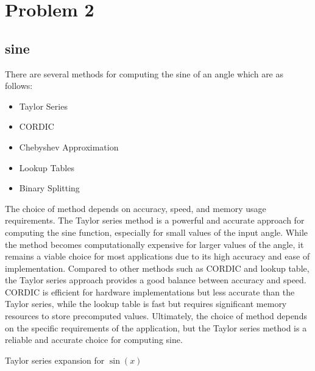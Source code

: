\chapter{Problem 2}

\section{sine \texorpdfstring{\small \cite{sin-franklin1974computing}\cite{sin-proakis2007digital}}{}}
There are several methods for computing the sine of an angle which are as follows:
\begin{itemize}
    \item Taylor Series
    \item CORDIC
    \item Chebyshev Approximation
    \item Lookup Tables
    \item Binary Splitting 
\end{itemize}

\noindent  The choice of method depends on accuracy, speed, and memory usage requirements. The Taylor series\cite{taylor-series} method is a powerful and accurate approach for computing the sine function, especially for small values of the input angle. While the method becomes computationally expensive for larger values of the angle, it remains a viable choice for most applications due to its high accuracy and ease of implementation. Compared to other methods such as CORDIC and lookup table, the Taylor series approach provides a good balance between accuracy and speed. CORDIC is efficient for hardware implementations but less accurate than the Taylor series, while the lookup table is fast but requires significant memory resources to store precomputed values. Ultimately, the choice of method depends on the specific requirements of the application, but the Taylor series method is a reliable and accurate choice for computing sine.

\begin{algorithm}[H]
\caption{Taylor series expansion for $\sin(x)$}\label{algo:sin}
\begin{algorithmic}[1]
\EndFor
{}
\end{algorithmic}
\end{algorithm}

